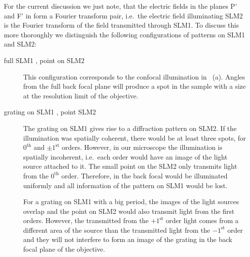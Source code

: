 For the current discussion we just note, that the electric fields in
the planes P' and F' in  form a Fourier
transform pair, i.e.\ the electric field illuminating SLM2 is the
Fourier transform of the field transmitted through SLM1. To discuss
this more thoroughly we distinguish the following configurations of
patterns on SLM1 and SLM2:
\newcommand{\sm}[1]{}
\begin{description}
\item[full SLM1 \sm{full}, point on SLM2 \sm{point}] This
  configuration corresponds to the confocal illumination in
  ~(a). Angles from the full back focal
  plane will produce a spot in the sample with a size at the
  resolution limit of the objective.
\item[grating on SLM1 \sm{grating-circle}, point SLM2 \sm{point}] The
  grating on SLM1 gives rise to a diffraction pattern on SLM2. If the
  illumination was spatially coherent, there would be at least three
  spots, for $0^\textrm{th}$ and $\pm1^\textrm{st}$ orders. However,
  in our microscope the illumination is spatially incoherent, i.e.\
  each order would have an image of the light source attached to it.
  The small point on the SLM2 only transmits light from the
  $0^\textrm{th}$ order. Therefore, in the back focal would be
  illuminated uniformly and all information of the pattern on SLM1
  would be lost.
  
  For a grating on SLM1 with a big period, the images of the light
  sources overlap and the point on SLM2 would also transmit light from
  the first orders. However, the transmitted from the $+1^\textrm{st}$
  order light comes from a different area of the source than the
  transmitted light from the $-1^\textrm{st}$ order and they will not
  interfere to form an image of the grating in the back focal plane of
  the objective.


\end{description}
